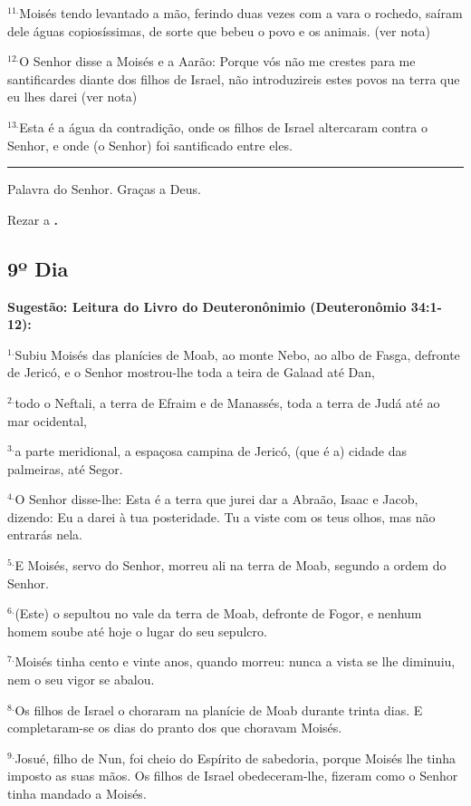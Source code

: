 \documentclass[a4paper,14pt]{extarticle} \usepackage[utf8]{inputenc}
\begin{document}
$^{11.}$Moisés tendo levantado a mão, ferindo duas vezes com a vara o rochedo, saíram dele águas copiosíssimas, de sorte que bebeu o povo e os animais. (ver nota)

$^{12.}$O Senhor disse a Moisés e a Aarão: Porque vós não me crestes para me santificardes diante dos filhos de Israel, não introduzireis estes povos na terra que eu lhes darei (ver nota)

$^{13.}$Esta é a água da contradição, onde os filhos de Israel altercaram contra o Senhor, e onde (o Senhor) foi santificado entre eles.


\par\noindent\rule{\textwidth}{0.4pt}

Palavra do Senhor. Graças a Deus.

Rezar a \textbf{.}
\subsection{9º Dia}
\textbf{Sugestão: Leitura do Livro do Deuteronônimio (Deuteronômio 34:1-12):}

$^{1.}$Subiu Moisés das planícies de Moab, ao monte Nebo, ao albo de Fasga, defronte de Jericó, e o Senhor mostrou-lhe toda a teira de Galaad até Dan,

$^{2.}$todo o Neftali, a terra de Efraim e de Manassés, toda a terra de Judá até ao mar ocidental,

$^{3.}$a parte meridional, a espaçosa campina de Jericó, (que é a) cidade das palmeiras, até Segor.

$^{4.}$O Senhor disse-lhe: Esta é a terra que jurei dar a Abraão, Isaac e Jacob, dizendo: Eu a darei à tua posteridade. Tu a viste com os teus olhos, mas não entrarás nela.

$^{5.}$E Moisés, servo do Senhor, morreu ali na terra de Moab, segundo a ordem do Senhor.

$^{6.}$(Este) o sepultou no vale da terra de Moab, defronte de Fogor, e nenhum homem soube até hoje o lugar do seu sepulcro.

$^{7.}$Moisés tinha cento e vinte anos, quando morreu: nunca a vista se lhe diminuiu, nem o seu vigor se abalou.

$^{8.}$Os filhos de Israel o choraram na planície de Moab durante trinta dias. E completaram-se os dias do pranto dos que choravam Moisés.

$^{9.}$Josué, filho de Nun, foi cheio do Espírito de sabedoria, porque Moisés lhe tinha imposto as suas mãos. Os filhos de Israel obedeceram-lhe, fizeram como o Senhor tinha mandado a Moisés.
\end{document}

